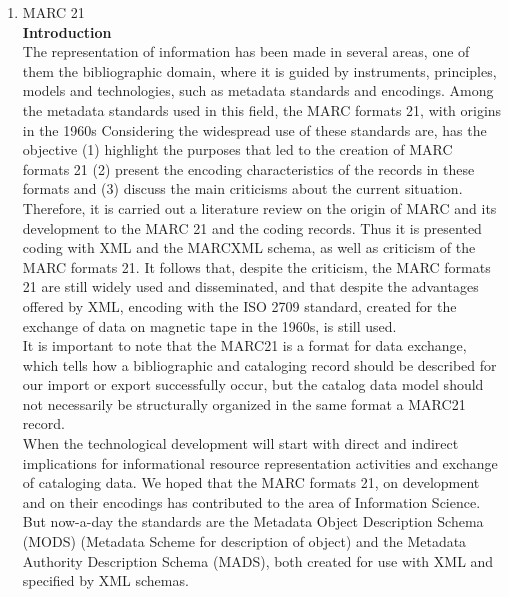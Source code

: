 \begin{enumerate}
	\item MARC 21\\
	{\bf Introduction}\\
	The representation of information has been made in several areas, one of them the bibliographic domain, where it is guided by instruments, principles, models and technologies, such as metadata standards and encodings. Among the metadata standards used in this field, the MARC formats 21, with origins in the 1960s Considering the widespread use of these standards are, has the objective (1) highlight the purposes that led to the creation of MARC formats 21 (2) present the encoding characteristics of the records in these formats and (3) discuss the main criticisms about the current situation. Therefore, it is carried out a literature review on the origin of MARC and its development to the MARC 21 and the coding records. Thus it is presented coding with XML and the MARCXML schema, as well as criticism of the MARC formats 21. It follows that, despite the criticism, the MARC formats 21 are still widely used and disseminated, and that despite the advantages offered by XML, encoding with the ISO 2709 standard, created for the exchange of data on magnetic tape in the 1960s, is still used. \\
	It is important to note that the MARC21 is a format for data exchange, which tells how a bibliographic and cataloging record should be described for our import or export successfully occur, but the catalog data model should not necessarily be structurally organized in the same format a MARC21 record. \\
	When the technological development will start with direct and indirect implications for informational resource representation activities and exchange of cataloging data. We hoped that the MARC formats 21, on development and on their encodings has contributed to the area of Information Science. \\
	But now-a-day the standards are the Metadata Object Description Schema (MODS) (Metadata Scheme for description of object) and the Metadata Authority Description Schema (MADS), both created for use with XML and specified by XML schemas.
	

\end{enumerate}
